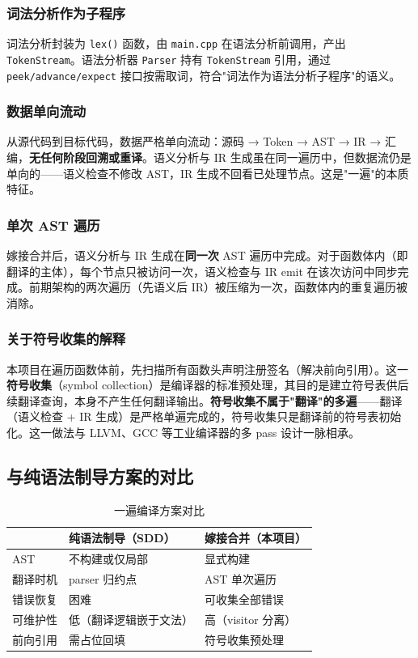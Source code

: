\documentclass[12pt,a4paper]{ctexart}
\begin{document}
\subsubsection{词法分析作为子程序}

词法分析封装为 \texttt{lex()} 函数，由 \texttt{main.cpp} 在语法分析前调用，产出 \texttt{TokenStream}。语法分析器 \texttt{Parser} 持有 \texttt{TokenStream} 引用，通过 \texttt{peek/advance/expect} 接口按需取词，符合"词法作为语法分析子程序"的语义。

\subsubsection{数据单向流动}

从源代码到目标代码，数据严格单向流动：源码 → Token → AST → IR → 汇编，\textbf{无任何阶段回溯或重译}。语义分析与 IR 生成虽在同一遍历中，但数据流仍是单向的——语义检查不修改 AST，IR 生成不回看已处理节点。这是"一遍"的本质特征。

\subsubsection{单次 AST 遍历}

嫁接合并后，语义分析与 IR 生成在\textbf{同一次} AST 遍历中完成。对于函数体内（即翻译的主体），每个节点只被访问一次，语义检查与 IR emit 在该次访问中同步完成。前期架构的两次遍历（先语义后 IR）被压缩为一次，函数体内的重复遍历被消除。

\subsubsection{关于符号收集的解释}

本项目在遍历函数体前，先扫描所有函数头声明注册签名（解决前向引用）。这一\textbf{符号收集}（symbol collection）是编译器的标准预处理，其目的是建立符号表供后续翻译查询，本身不产生任何翻译输出。\textbf{符号收集不属于"翻译"的多遍}——翻译（语义检查 + IR 生成）是严格单遍完成的，符号收集只是翻译前的符号表初始化。这一做法与 LLVM、GCC 等工业编译器的多 pass 设计一脉相承。

\subsection{与纯语法制导方案的对比}

\begin{table}[H]
\centering
\caption{一遍编译方案对比}
\begin{tabular}{|l|l|l|}
\hline
 & \textbf{纯语法制导（SDD）} & \textbf{嫁接合并（本项目）} \\
\hline
AST & 不构建或仅局部 & 显式构建 \\
\hline 翻译时机 & parser 归约点 & AST 单次遍历 \\
\hline 错误恢复 & 困难 & 可收集全部错误 \\
\hline 可维护性 & 低（翻译逻辑嵌于文法） & 高（visitor 分离） \\
\hline 前向引用 & 需占位回填 & 符号收集预处理 \\
\hline
\end{tabular}
\end{table}
\end{document}
